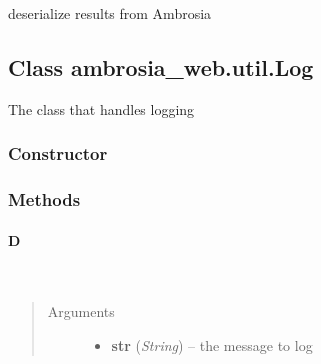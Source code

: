 \documentclass[letterpaper,10pt,english]{sphinxmanual}
\begin{document}
deserialize results from Ambrosia


\subsection{Class ambrosia\_web.util.Log}
\label{ambrosia_web.util.Log:class-ambrosia-web-util-log}\label{ambrosia_web.util.Log::doc}
The class that handles logging


\subsubsection{Constructor}
\label{ambrosia_web.util.Log:constructor}

\begin{fulllineitems}
\label{ambrosia_web.util.Log:ambrosia_web.util.Log}
\end{fulllineitems}



\subsubsection{Methods}
\label{ambrosia_web.util.Log:methods}

\paragraph{D}
\label{ambrosia_web.util.Log:d}

\begin{fulllineitems}
\label{ambrosia_web.util.Log:ambrosia_web.util.Log.D}~\begin{quote}\begin{description}
\item[{Arguments}] \leavevmode\begin{itemize}
\item {} 
\textbf{str} (\emph{String}) -- the message to log

\end{itemize}

\end{description}\end{quote}

\end{fulllineitems}
\end{document}
